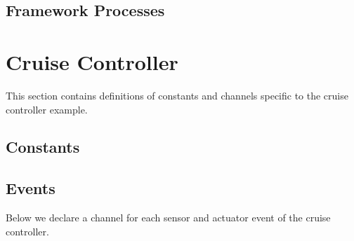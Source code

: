 \documentclass{article}
\newcommand{\reducevspaceaftersection}{\vspace{-1em}}
\begin{document}
\subsection{Framework Processes}

\begin{circusbox}

\end{circusbox}

\newpage


%


%


\section{Cruise Controller}

This section contains definitions of constants and channels specific to the cruise controller example.

\subsection{Constants}
\reducevspaceaftersection



\subsection{Events}

Below we declare a channel for each sensor and actuator event of the cruise controller.
%

\end{document}
